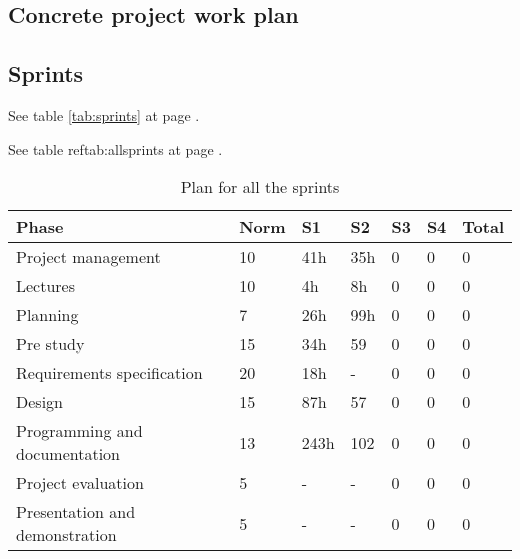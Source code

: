 

\subsection{Concrete project work plan}

\subsection*{Sprints}
See table \ref{tab:sprints} at page \pageref{tab:sprints}.

See table ref{tab:allsprints} at page \pageref{tab:allsprints}.
\begin{table}
\begin{tabular}{l|l|l|l|l|l|l}
\textbf{Phase} &  \textbf{Norm} & \textbf{S1} & \textbf{S2}  & \textbf{S3} & \textbf{S4} & \textbf{Total} \\ \hline \hline
Project management & 10 & 41h & 35h & 0 & 0 & 0\\ \hline
Lectures & 10 & 4h & 8h & 0 & 0 & 0\\ \hline
Planning & 7 & 26h & 99h & 0 & 0 & 0\\ \hline
Pre study & 15 & 34h & 59 & 0 & 0 & 0\\ \hline
Requirements specification & 20 & 18h & - & 0 & 0 & 0\\ \hline
Design & 15 & 87h & 57 & 0 & 0 & 0\\ \hline
Programming and documentation & 13 & 243h & 102 & 0 & 0 & 0\\ \hline
Project evaluation & 5 & - & - & 0 & 0 & 0\\ \hline
Presentation and demonstration & 5 & - & - & 0 & 0 & 0
\end{tabular}
\caption{Plan for all the sprints} \label{tab:allsprints}
\end{table}

